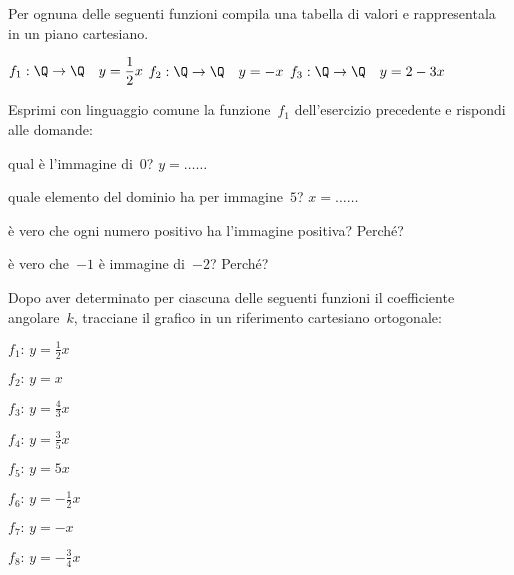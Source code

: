 \begin{esercizio}
\label{ese:D.37}
Per ognuna delle seguenti funzioni compila una tabella di valori e 
rappresentala in un piano cartesiano.

 \(f_1:\Q \rightarrow \Q\quad y=\dfrac{1}{2}x\) \quad
 \(f_2:\Q \rightarrow \Q\quad y=-x\) \quad
 \(f_3:\Q \rightarrow \Q\quad y=2-3x\)
\end{esercizio}

\begin{esercizio}
\label{ese:D.38}
Esprimi con linguaggio comune la funzione~\(f_1\) dell'esercizio precedente e 
rispondi alle domande:

\begin{enumeratea}
\item qual è l'immagine di~\(0\)?  \(y=\ldots \ldots \)
\item quale elemento del dominio ha per immagine~\(5\)? \(x=\ldots \ldots \)
\item è vero che ogni numero positivo ha l'immagine positiva? Perché?
\item è vero che~\(-1\) è immagine di~\(-2\)? Perché?
\end{enumeratea}
\end{esercizio}

\begin{esercizio}
\label{ese:D.39}
Dopo aver determinato per ciascuna delle seguenti funzioni il coefficiente 
angolare~\(k\), tracciane il grafico in un riferimento cartesiano ortogonale:
\begin{multicols}{3}
 \begin{enumeratea}
\item \(f_{1}:\, y=\frac{1}{2}x\)
\item \(f_{2}:\, y=x\)
\item \(f_{3}:\, y=\frac{4}{3}x\)
\item \(f_{4}:\, y=\frac{3}{5}x\)
\item \(f_{5}:\, y=5x\)
\item \(f_{6}:\, y=-{\frac{1}{2}}x\)
\item \(f_{7}:\, y=-x\)
\item \(f_{8}:\, y=-{\frac{3}{4}}x\)
\end{enumeratea}
\end{multicols}
\end{esercizio}

